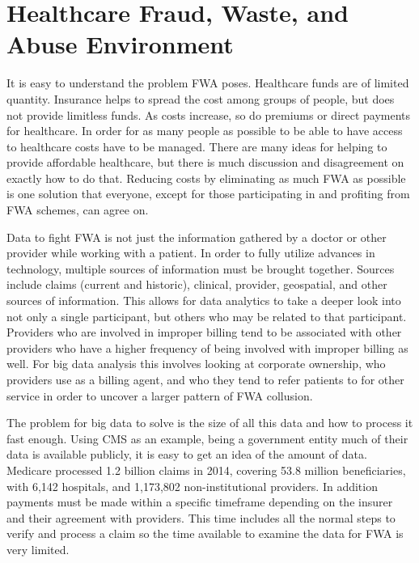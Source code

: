 \documentclass[sigconf]{acmart}
\begin{document}
\section{Healthcare Fraud, Waste, and Abuse Environment}

It is easy to understand the problem FWA poses.  Healthcare funds are of limited 
quantity.  Insurance helps to spread the cost among groups of people, but does not 
provide limitless funds.  As costs increase, so do premiums or direct payments for 
healthcare.  In order for as many people as possible to be able to have access to 
healthcare costs have to be managed.  There are many ideas for helping to provide 
affordable healthcare, but there is much discussion and disagreement on exactly how 
to do that.  Reducing costs by eliminating as much FWA as possible is one solution 
that everyone, except for those participating in and profiting from FWA schemes, 
can agree on.

Data to fight FWA is not just the information gathered by a doctor or other provider 
while working with a patient.  In order to fully utilize advances in technology, 
multiple sources of information must be brought together.  Sources include claims 
(current and historic), clinical, provider, geospatial, and other sources of 
information.  This allows for data analytics to take a deeper look into not only a 
single participant, but others who may be related to that participant.  Providers who 
are involved in improper billing tend to be associated with other providers who have a 
higher frequency of being involved with improper billing as well.  For big data analysis 
this involves looking at corporate ownership, who providers use as a billing agent, and 
who they tend to refer patients to for other service in order to uncover a larger 
pattern of FWA collusion.\cite{RevCycle}

The problem for big data to solve is the size of all this data and how to process it 
fast enough.  Using CMS as an example, being a government entity much of their data is 
available publicly, it is easy to get an idea of the amount of data.  Medicare processed 
1.2 billion claims in 2014, covering 53.8 million beneficiaries, with 6,142  
hospitals, and 1,173,802 non-institutional providers\cite{2015CMSStatistics}.  In addition
payments must be made within a specific timeframe depending on the insurer and their 
agreement with providers.  This time includes all the normal steps to verify and process 
a claim so the time available to examine the data for FWA is very limited.
\end{document}
